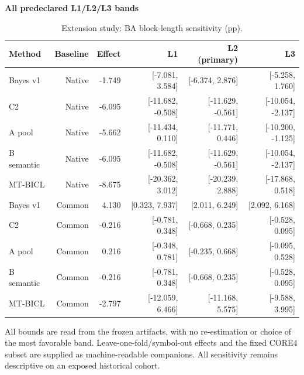 \begin{table}[!htb]
\centering\small
\setlength{\tabcolsep}{3pt}
\renewcommand{\arraystretch}{1.12}
\caption{Extension study: BA block-length sensitivity (pp).}
\label{tab:u09-sensitivity-ba}
\textbf{All predeclared L1/L2/L3 bands}\par\smallskip
\begin{tabular}{lrrrrr}
\hline
Method & Baseline & Effect & L1 & L2 (primary) & L3 \\
\hline
Bayes v1 & Native & -1.749 & [-7.081, 3.584] & [-6.374, 2.876] & [-5.258, 1.760] \\
C2 & Native & -6.095 & [-11.682, -0.508] & [-11.629, -0.561] & [-10.054, -2.137] \\
A pool & Native & -5.662 & [-11.434, 0.110] & [-11.771, 0.446] & [-10.200, -1.125] \\
B semantic & Native & -6.095 & [-11.682, -0.508] & [-11.629, -0.561] & [-10.054, -2.137] \\
MT-BICL & Native & -8.675 & [-20.362, 3.012] & [-20.239, 2.888] & [-17.868, 0.518] \\
Bayes v1 & Common & 4.130 & [0.323, 7.937] & [2.011, 6.249] & [2.092, 6.168] \\
C2 & Common & -0.216 & [-0.781, 0.348] & [-0.668, 0.235] & [-0.528, 0.095] \\
A pool & Common & 0.216 & [-0.348, 0.781] & [-0.235, 0.668] & [-0.095, 0.528] \\
B semantic & Common & -0.216 & [-0.781, 0.348] & [-0.668, 0.235] & [-0.528, 0.095] \\
MT-BICL & Common & -2.797 & [-12.059, 6.466] & [-11.168, 5.575] & [-9.588, 3.995] \\
\hline
\end{tabular}\par\medskip
\begin{minipage}{\textwidth}\footnotesize All bounds are read from the frozen artifacts, with no re-estimation or choice of the most favorable band. Leave-one-fold/symbol-out effects and the fixed CORE4 subset are supplied as machine-readable companions. All sensitivity remains descriptive on an exposed historical cohort.\end{minipage}
\end{table}
